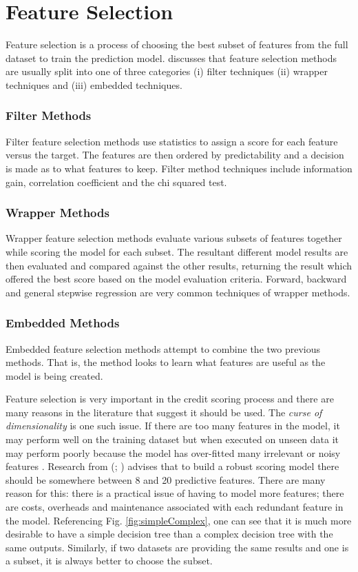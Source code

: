\section{Feature Selection}\label{sec2:featureSection}
Feature selection is a process of choosing the best subset of features from the full dataset to train the prediction model. \cite{guyon_introduction_2003} discusses that feature selection methods are usually split into one of three categories (i) filter techniques (ii) wrapper techniques and (iii) embedded techniques. 

\subsubsection{Filter Methods}
Filter feature selection methods use statistics to assign a score for each feature versus the target. The features are then ordered by predictability and a decision is made as to what features to keep. Filter method techniques include information gain, correlation coefficient and the chi squared test.

\subsubsection{Wrapper Methods}
Wrapper feature selection methods evaluate various subsets of features together while scoring the model for each subset. The resultant different model results are then evaluated and compared against the other results, returning the result which offered the best score based on the model evaluation criteria. Forward, backward and general stepwise regression are very common techniques of wrapper methods.

\subsubsection{Embedded Methods}
Embedded feature selection methods attempt to combine the two previous methods. That is, the method looks to learn what features are useful as the model is being created. 

Feature selection is very important in the credit scoring process and there are many reasons in the literature that suggest it should be used. The \textit{curse of dimensionality} is one such issue. If there are too many features in the model, it may perform well on the training dataset but when executed on unseen data it may perform poorly because the model has over-fitted many irrelevant or noisy features \citep{loughrey_overfitting_2005}. Research from (\cite{thomas_consumer_2009}; \cite{mays_credit_2004}) advises that to build a robust scoring model there should be somewhere between 8 and 20 predictive features. There are many reason for this: there is a practical issue of having to model more features; there are costs, overheads and maintenance associated with each redundant feature in the model. Referencing Fig. \ref{fig:simpleComplex}, one can see that it is much more desirable to have a simple decision tree than a complex decision tree with the same outputs. Similarly, if two datasets are providing the same results and one is a subset, it is always better to choose the subset. 

